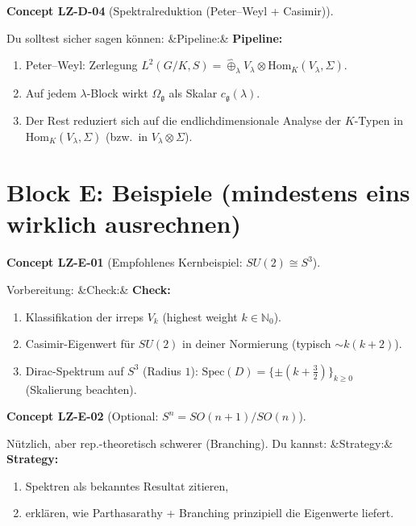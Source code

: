\documentclass[10pt, letterpaper]{article}
\newcommand{\N}{\mathbb{N}}
\newcommand{\Hom}{\mathrm{Hom}}
\newenvironment{romanenum}[1][]
  {%
    \ifx&#1&
    \else
      \textbf{#1}\quad
    \fi
    \begin{enumerate}[label=\roman*)]
  }
  {%
    \end{enumerate}%
  }
\newcommand{\CustomHeading}[3]{%
  \par\medskip\noindent%
  \textbf{#1 #2} \textnormal{(#3)}.\enskip%
}
\newenvironment{CONC}[2]{\begin{unitbox}\CustomHeading{Concept}{#1}{#2}}{\end{unitbox}}
\begin{document}
\begin{CONC}{LZ-D-04}{Spektralreduktion (Peter--Weyl + Casimir)}
Du solltest sicher sagen k\"onnen:
\begin{romanenum}[Pipeline:]
\item Peter--Weyl: Zerlegung $L^2(G/K,S)=\widehat{\oplus}_\lambda V_\lambda\otimes \Hom_K(V_\lambda,\Sigma)$.
\item Auf jedem $\lambda$-Block wirkt $\Omega_{\mathfrak g}$ als Skalar $c_{\mathfrak g}(\lambda)$.
\item Der Rest reduziert sich auf die endlichdimensionale Analyse der $K$-Typen in $\Hom_K(V_\lambda,\Sigma)$
(bzw.\ in $V_\lambda\otimes \Sigma$).
\end{romanenum}
\end{CONC}

\section{Block E: Beispiele (mindestens eins wirklich ausrechnen)}

\begin{CONC}{LZ-E-01}{Empfohlenes Kernbeispiel: $SU(2)\cong S^3$}
Vorbereitung:
\begin{romanenum}[Check:]
\item Klassifikation der irreps $V_k$ (highest weight $k\in\N_0$).
\item Casimir-Eigenwert f\"ur $SU(2)$ in deiner Normierung (typisch $\sim k(k+2)$).
\item Dirac-Spektrum auf $S^3$ (Radius $1$): $\mathrm{Spec}(D)=\{\pm(k+\tfrac32)\}_{k\ge 0}$ (Skalierung beachten).
\end{romanenum}
\end{CONC}

\begin{CONC}{LZ-E-02}{Optional: $S^n=SO(n+1)/SO(n)$}
N\"utzlich, aber rep.-theoretisch schwerer (Branching). Du kannst:
\begin{romanenum}[Strategy:]
\item Spektren als bekanntes Resultat zitieren,
\item erkl\"aren, wie Parthasarathy + Branching prinzipiell die Eigenwerte liefert.
\end{romanenum}
\end{CONC}
\end{document}

